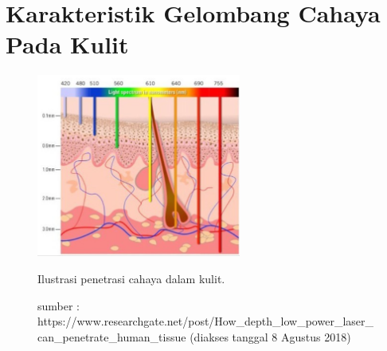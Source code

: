 \section{Karakteristik Gelombang Cahaya Pada Kulit}

\begin{figure}[ht]
	\centering
	\includegraphics[width=0.6\textwidth]{light}
	\caption{Ilustrasi penetrasi cahaya dalam kulit.}
	\caption*{sumber : https://www.researchgate.net/post/How\_depth\_low\_power\_laser\_can\_penetrate\_human\_tissue \citep{web2} (diakses tanggal 8 Agustus 2018)}
	\label{fig:light}   
\end{figure}

